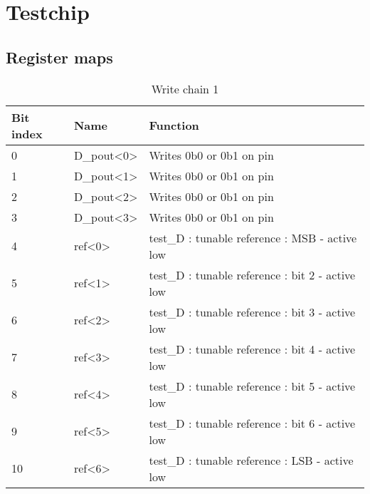 \chapter{Testchip}
\section{Register maps}
\label{apx:testchip-register-maps}

\begin{table}[!htbp]
\centering
\begin{tabular}{@{}lll@{}}
\toprule
Bit index& Name & Function \\ \toprule
0	& D_{pout}<0>	  & Writes 0b0 or 0b1 on pin \\
1	& D_{pout}<1>	  & Writes 0b0 or 0b1 on pin \\
2	& D_{pout}<2>	  & Writes 0b0 or 0b1 on pin \\
3	& D_{pout}<3>   & Writes 0b0 or 0b1 on pin \\
4	& ref<0>	    & test\_D : tunable reference : MSB - active low \\
5	& ref<1>	    & test\_D : tunable reference : bit 2 - active low \\
6	& ref<2>      &	test\_D : tunable reference : bit 3 - active low \\
7	& ref<3>      &	test\_D : tunable reference : bit 4 - active low \\
8	& ref<4>      &	test\_D : tunable reference : bit 5 - active low \\
9	& ref<5>      &	test\_D : tunable reference : bit 6 - active low \\
10 &	ref<6>    &	test\_D : tunable reference : LSB - active low \\
\bottomrule
\end{tabular}
\caption{Write chain 1}
\label{tab:write-chain-1}
\end{table}

